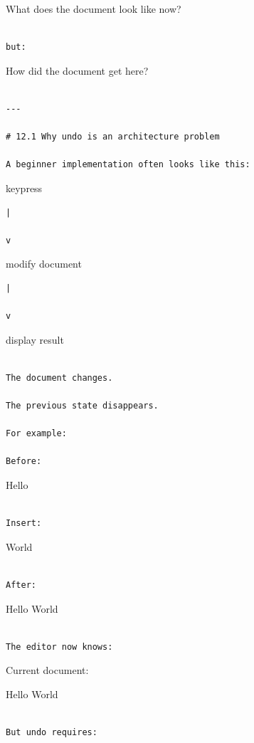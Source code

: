 \documentclass[
  oneside,
  openany]{book}
\begin{document}
What does the document look like now?

\begin{verbatim}

but:
\end{verbatim}

How did the document get here?

\begin{verbatim}

---

# 12.1 Why undo is an architecture problem

A beginner implementation often looks like this:
\end{verbatim}

keypress

\begin{verbatim}
|

v
\end{verbatim}

modify document

\begin{verbatim}
|

v
\end{verbatim}

display result

\begin{verbatim}

The document changes.

The previous state disappears.

For example:

Before:
\end{verbatim}

Hello

\begin{verbatim}

Insert:
\end{verbatim}

World

\begin{verbatim}

After:
\end{verbatim}

Hello World

\begin{verbatim}

The editor now knows:
\end{verbatim}

Current document:

Hello World

\begin{verbatim}

But undo requires:
\end{verbatim}
\end{document}
